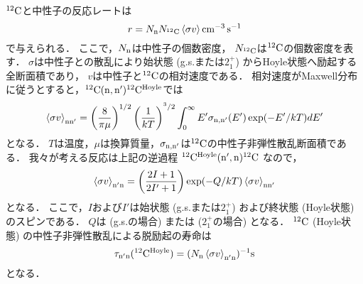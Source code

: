\documentclass[../master]{subfiles}
\begin{document}
${}^{12}{\rm C}$と中性子の反応レートは
\begin{equation}
  r = N_{\rm n}N_{{}^{12}{\rm C}}\braket{\sigma v} \si{\per\cubic\centi\metre\per\second}
  \label{eq::r}
\end{equation}
で与えられる．
ここで，$N_{{\rm n}}$は中性子の個数密度，
$N_{{}^{12}{\rm C}}$は${}^{12}{\rm C}$の個数密度を表す．
$\sigma$は中性子との散乱により始状態 (g.s.または$2_{1}^{+}$) からHoyle状態へ励起する全断面積であり，
$v$は中性子と${}^{12}{\rm C}$の相対速度である．
相対速度がMaxwell分布に従うとすると，${}^{12}{\rm C}({\rm n},{\rm n'}){}^{12}{\rm C}^{{\rm Hoyle}}$では
\begin{equation}
  \braket{\sigma v}_{\rm nn'} =
  \left(\frac{8}{\pi\mu}\right)^{1/2}\left(\frac{1}{kT}\right)^{^3/2}
  \int^{\infty}_{0}E'\sigma_{\rm n,n'}(E')\exp(-E'/kT)dE'
  \label{eq::sigmann'}
\end{equation}
となる．
$T$は温度，$\mu$は換算質量，$\sigma_{\rm n,n'}$は${}^{12}{\rm C}$の中性子非弾性散乱断面積である．
我々が考える反応は上記の逆過程 ${}^{12}{\rm C}^{{\rm Hoyle}}({\rm n',n}){}^{12}{\rm C}$ なので，
\begin{equation}
  \braket{\sigma v}_{\rm n'n} = \left(\frac{2I+1}{2I'+1}\right)
  \exp(-Q/kT)\braket{\sigma v}_{\rm nn'}
  \label{eq::sigman'n}
\end{equation}
となる．
ここで，$I$および$I'$は始状態 (g.s.または$2_{1}^{+}$)
および終状態 (Hoyle状態) のスピンである．
$Q$は (g.s.の場合) または
 ($2_{1}^{+}$の場合) となる．
${}^{12}{\rm C}$ (Hoyle状態) の中性子非弾性散乱による脱励起の寿命は
\begin{equation}
  \tau_{\rm n'n}({}^{12}{\rm C}^{{\rm Hoyle}}) =
  (N_{\rm n}\braket{\sigma v}_{\rm n'n})^{-1} {\rm s}
  \label{eq::tau}
\end{equation}
となる．
\end{document}
